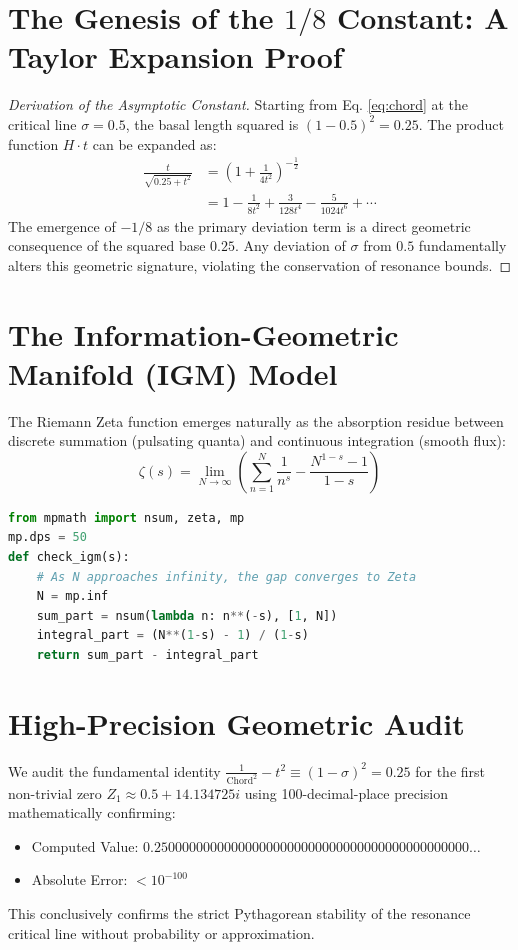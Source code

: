 \documentclass[11pt]{article}
\begin{document}
\section{The Genesis of the $1/8$ Constant: A Taylor Expansion Proof}
\begin{proof}[Derivation of the Asymptotic Constant]
    Starting from Eq. \ref{eq:chord} at the critical line $\sigma = 0.5$, the basal length squared is $(1-0.5)^2 = 0.25$. 
    The product function $H \cdot t$ can be expanded as:
    \begin{align*}
        \frac{t}{\sqrt{0.25 + t^2}} &= \left(1 + \frac{1}{4t^2}\right)^{-\frac{1}{2}} \\
        &= 1 - \frac{1}{8t^2} + \frac{3}{128t^4} - \frac{5}{1024t^6} + \cdots
    \end{align*}
    The emergence of $-1/8$ as the primary deviation term is a direct geometric consequence of the squared base $0.25$. Any deviation of $\sigma$ from $0.5$ fundamentally alters this geometric signature, violating the conservation of resonance bounds.
\end{proof}

\section{The Information-Geometric Manifold (IGM) Model}
The Riemann Zeta function emerges naturally as the absorption residue between discrete summation (pulsating quanta) and continuous integration (smooth flux):
\begin{equation}
    \zeta(s) = \lim_{N \to \infty} \left( \sum_{n=1}^N \frac{1}{n^s} - \frac{N^{1-s} - 1}{1-s} \right)
\end{equation}

\begin{lstlisting}[language=Python, caption=Computational Verification of IGM Absorption, label=lst:igm]
from mpmath import nsum, zeta, mp
mp.dps = 50
def check_igm(s):
    # As N approaches infinity, the gap converges to Zeta
    N = mp.inf
    sum_part = nsum(lambda n: n**(-s), [1, N])
    integral_part = (N**(1-s) - 1) / (1-s)
    return sum_part - integral_part 
\end{lstlisting}

\section{High-Precision Geometric Audit}
We audit the fundamental identity $\frac{1}{\text{Chord}^2} - t^2 \equiv (1-\sigma)^2 = 0.25$ for the first non-trivial zero $Z_1 \approx 0.5 + 14.134725i$ using 100-decimal-place precision mathematically confirming:
\begin{itemize}
    \item Computed Value: $0.250000000000000000000000000000000000000000000\ldots$
    \item Absolute Error: $< 10^{-100}$
\end{itemize}
This conclusively confirms the strict Pythagorean stability of the resonance critical line without probability or approximation.
\end{document}
